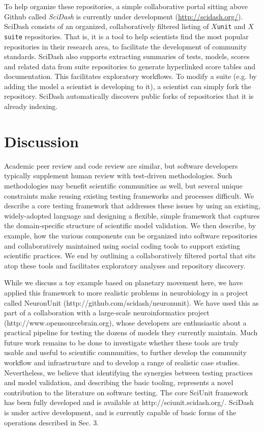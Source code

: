 \documentclass[9pt]{sig-alternate}
\newcommand{\verbx}[1]{\lstinline{#1}}
\begin{document}
To help organize these repositories, a simple collaborative portal sitting above Github called \textit{SciDash} is currently under development (\url{http://scidash.org/}). SciDash consists of an organized, collaboratively filtered listing of $X$\verbx{unit} and $X$\verbx{suite} repositories. That is, it is a tool to help scientists find the most popular repositories in their research area, to facilitate the development of community standards. SciDash also supports extracting summaries of tests, models, scores and related data from suite repositories to generate hyperlinked score tables and documentation. This facilitates exploratory workflows. To modify a suite (e.g. by adding the model a scientist is developing to it), a scientist can simply fork the repository. SciDash automatically discovers public forks of repositories that it is already indexing.
 
\section{Discussion}\label{discussion}
Academic peer review and code review are similar, but software developers typically supplement human review with test-driven methodologies. Such methodologies may benefit scientific communities as well, but several unique  constraints make reusing existing testing frameworks and processes difficult. We describe a core testing framework that addresses these issues  by using an existing, widely-adopted language and designing a flexible, simple framework that captures the domain-specific structure of scientific model validation. We then describe, by example, how the various components can be organized into software repositories and collaboratively maintained using social coding tools to support existing scientific practices. We end by outlining a collaboratively filtered portal that sits atop these tools and facilitates exploratory analyses and repository discovery. 

While we discuss a toy example based on planetary movement here, we have applied this framework to more realistic problems in neurobiology in a project called NeuronUnit (http://github.com/scidash/neuronunit). We have used this as part of a collaboration with a large-scale neuroinformatics project (http://www.opensourcebrain.org), whose developers are enthusiastic about a practical pipeline for testing the dozens of models they currently maintain. Much future work remains to be done to investigate whether these tools are truly usable and useful to scientific communities, to further develop the community workflow and infrastructure and to develop a range of realistic case studies. Nevertheless, we believe that identifying the synergies between testing practices and model validation, and describing the basic tooling, represents a novel contribution to the literature on software testing. The core SciUnit framework has been fully developed and is available at http://sciunit.scidash.org/. SciDash is under active development, and is currently capable of basic forms of the operations described in Sec. 3. 
\end{document}
